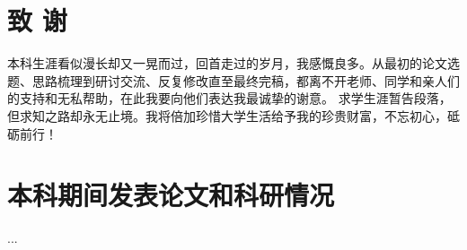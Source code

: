 \documentclass[openany,oneside]{book}
\theoremstyle{definition}
\theoremstyle{definition}
\begin{document}
	
	
	
	

\clearpage
{}
{}

\chapter*{致 \qquad 谢}
\thispagestyle{empty}
本科生涯看似漫长却又一晃而过，回首走过的岁月，我感慨良多。从最初的论文选题、思路梳理到研讨交流、反复修改直至最终完稿，都离不开老师、同学和亲人们的支持和无私帮助，在此我要向他们表达我最诚挚的谢意。
求学生涯暂告段落，但求知之路却永无止境。我将倍加珍惜大学生活给予我的珍贵财富，不忘初心，砥砺前行！
\chapter*{本科期间发表论文和科研情况}
\thispagestyle{empty}

...
\end{document}
